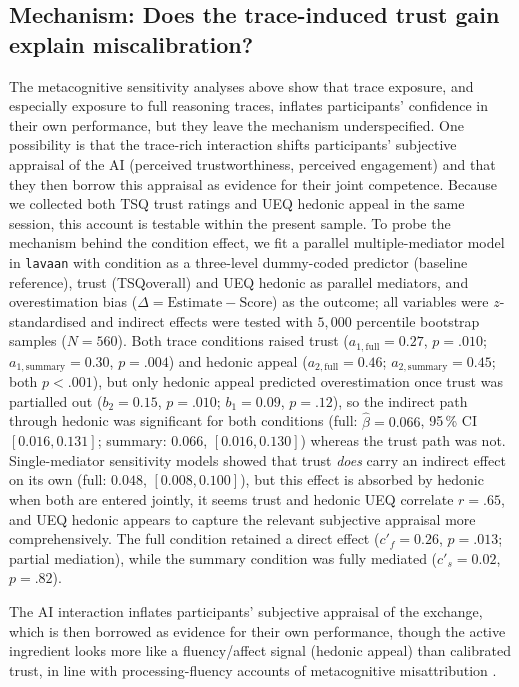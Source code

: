 \documentclass[acmlarge,review=true, anonymous=true]{acmart}
\begin{document}
\subsection{Mechanism: Does the trace-induced trust gain explain miscalibration?}
\label{sec:mediation}
The metacognitive sensitivity analyses above show that trace exposure, and especially exposure to full reasoning traces, inflates participants' confidence in their own performance, but they leave the mechanism underspecified.
One possibility is that the trace-rich interaction shifts participants' subjective appraisal of the AI (perceived trustworthiness, perceived engagement) and that they then borrow this appraisal as evidence for their joint competence. Because we collected both TSQ trust ratings and UEQ hedonic appeal in the same session, this account is testable within the present sample.
To probe the mechanism behind the condition effect, we fit a parallel multiple-mediator model in \texttt{lavaan} with condition as a three-level dummy-coded predictor (baseline reference), trust (TSQoverall) and UEQ hedonic as parallel mediators, and overestimation bias ($\Delta = \mathrm{Estimate} - \mathrm{Score}$) as the outcome; all variables were $z$-standardised and indirect effects
were tested with $5{,}000$ percentile bootstrap samples ($N = 560$).
Both trace conditions raised trust ($a_{1,\text{full}} = 0.27$, $p = .010$; $a_{1,\text{summary}} = 0.30$, $p = .004$) and hedonic appeal ($a_{2,\text{full}} = 0.46$; $a_{2,\text{summary}} = 0.45$; both $p < .001$), but only hedonic appeal predicted overestimation once trust was partialled out ($b_{2} = 0.15$, $p = .010$;
$b_{1} = 0.09$, $p = .12$), so the indirect path through hedonic was significant for both conditions (full: $\hat{\beta} = 0.066$, 95\,\% CI $[0.016, 0.131]$; summary: $0.066$, $[0.016, 0.130]$)
whereas the trust path was not. Single-mediator sensitivity models showed that trust \emph{does} carry an indirect effect on its own (full: $0.048$, $[0.008, 0.100]$), but this effect is absorbed by
hedonic when both are entered jointly, it seems trust and hedonic UEQ correlate $r = .65$, and UEQ hedonic appears to capture the relevant subjective appraisal more comprehensively. The full condition retained a direct
effect ($c'_{f} = 0.26$, $p = .013$; partial mediation), while the summary condition was fully mediated ($c'_{s} = 0.02$, $p = .82$).

The AI interaction inflates participants' subjective appraisal of the exchange, which is then borrowed as evidence for their own performance, though the active ingredient looks more like a fluency/affect signal (hedonic appeal) than calibrated trust, in line with processing-fluency accounts of metacognitive misattribution \cite{}.
\end{document}
